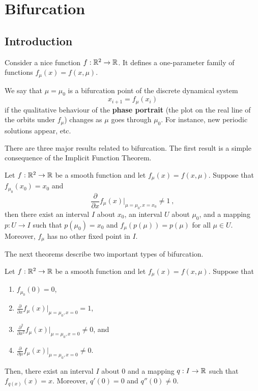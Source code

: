 \chapter{Bifurcation}

\section{Introduction}

Consider a nice function $f:\mathbb{R}^2 \rightarrow \mathbb{R}$.  It defines a
one-parameter family of functions $f_\mu(x) = f(x,\mu)$.

We say that $\mu = \mu_0$ is a bifurcation point of the discrete
dynamical system
\[
x_{i+1} = f_\mu(x_i)
\]
if the qualitative behaviour of the {\bfseries phase portrait} (the
plot on the real line of the orbits under $f_\mu$) changes as $\mu$
goes through $\mu_0$.  For instance, new periodic solutions appear,
etc.

There are three major results related to bifurcation.  The first
result is a simple consequence of the Implicit Function Theorem.

\begin{theo} \label{IFTforDS}
Let $f:\mathbb{R}^2 \rightarrow \mathbb{R}$ be a smooth function and let
$f_\mu(x)= f(x,\mu)$.  Suppose that $f_{\mu_0}(x_0) = x_0$ and
\[
\frac{\partial}{\partial x} f_{\mu}(x)\bigg|_{\mu=\mu_0,x=x_0} \neq 1  \ ,
\]
then there exist an interval $I$ about $x_0$, an interval $U$ about
$\mu_0$, and a mapping $p:U\rightarrow I$ such that $p(\mu_0)=x_0$ and
$f_\mu(p(\mu))=p(\mu)$ for all $\mu \in U$.  Moreover, $f_\mu$ has no
other fixed point in $I$.
\end{theo}

The next theorems describe two important types of bifurcation.

\begin{theo}
Let $f:\mathbb{R}^2 \rightarrow \mathbb{R}$ be a smooth function and let
$f_\mu(x)= f(x,\mu)$.  Suppose that
\begin{enumerate}
\item $\displaystyle f_{\mu_0}(0)=0$,
\item $\displaystyle \frac{\partial}{\partial x}
f_{\mu}(x)\bigg|_{\mu=\mu_0,x=0} = 1$,
\item $\displaystyle \frac{\partial^2}{\partial x^2}
f_{\mu}(x)\bigg|_{\mu=\mu_0,x=0} \neq 0$, and
\item $\displaystyle \frac{\partial}{\partial \mu}
f_\mu(x)\big|_{\mu=\mu_0,x=0} \neq 0$.
\end{enumerate}
Then, there exist an interval $I$ about $0$ and a mapping
$q:I\rightarrow \mathbb{R}$ such that $f_{q(x)}(x) = x$.  Moreover,
$q'(0) = 0$ and $q''(0) \neq 0$.
\end{theo}

